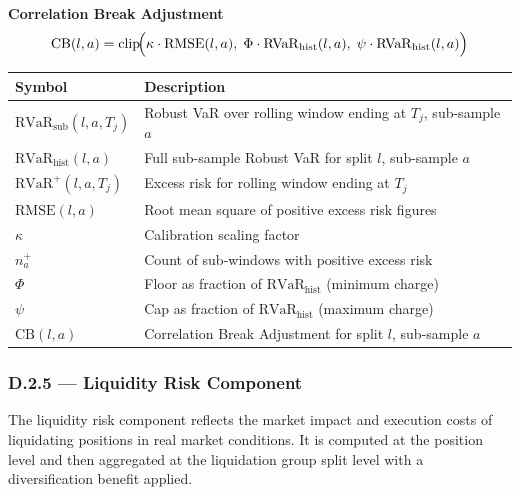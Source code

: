 \documentclass[9pt, a4paper]{extarticle}
\newenvironment{formulabox}{\par\addvspace{4pt}}{\par\addvspace{4pt}}
\newcommand{\vartableheader}{%
    \textbf{Symbol} & \textbf{Description}\\
}
\begin{document}
\begin{formulabox}
\textbf{Correlation Break Adjustment}
\begin{equation*}
    \mathrm{CB}(l,a) = \mathrm{clip}\!\Bigl(
        \kappa \cdot \mathrm{RMSE}(l,a),\;
        \Phi \cdot \mathrm{RVaR}_{\mathrm{hist}}(l,a),\;
        \psi \cdot \mathrm{RVaR}_{\mathrm{hist}}(l,a)
    \Bigr)
\end{equation*}
\end{formulabox}

\begin{tabularx}{\linewidth}{lX}
\toprule
\vartableheader
\midrule
$\mathrm{RVaR}_{\mathrm{sub}}(l,a,T_j)$ & Robust VaR over rolling window ending at $T_j$,
                                           sub-sample $a$ \\
$\mathrm{RVaR}_{\mathrm{hist}}(l,a)$    & Full sub-sample Robust VaR for split $l$,
                                           sub-sample $a$ \\
$\mathrm{RVaR}^{+}(l,a,T_j)$           & Excess risk for rolling window ending at $T_j$ \\
$\mathrm{RMSE}(l,a)$                    & Root mean square of positive excess risk figures \\
$\kappa$                                & Calibration scaling factor \\
$n^{+}_a$                               & Count of sub-windows with positive excess risk \\
$\Phi$                                  & Floor as fraction of $\mathrm{RVaR}_{\mathrm{hist}}$
                                           (minimum charge) \\
$\psi$                                  & Cap as fraction of $\mathrm{RVaR}_{\mathrm{hist}}$
                                           (maximum charge) \\
$\mathrm{CB}(l,a)$                      & Correlation Break Adjustment for split $l$,
                                           sub-sample $a$ \\
\bottomrule
\end{tabularx}

\newpage

\subsubsection{D.2.5 — Liquidity Risk Component}

The liquidity risk component reflects the market impact and execution costs of
liquidating positions in real market conditions. It is computed at the position
level and then aggregated at the liquidation group split level with a
diversification benefit applied.
\end{document}
